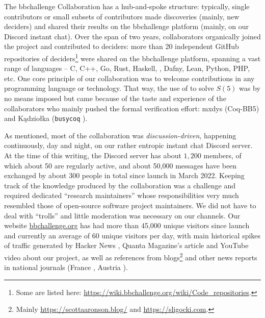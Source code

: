 \documentclass[a4paper,british]{article}
\theoremstyle{definition} %
\numberwithin{equation}{section}
\theoremstyle{definition} %
\newcommand{\CoqBB}{Coq-BB5\xspace}
\begin{document}
The bbchallenge Collaboration has a hub-and-spoke structure: typically, single contributors or small subsets of contributors made discoveries (mainly, new deciders) and shared their results on the bbchallenge platform (mainly, on our Discord instant chat). Over the span of two years, collaborators organically joined the project and contributed to deciders: more than 20 independent GitHub repositories of deciders\footnote{Some are listed here: \url{https://wiki.bbchallenge.org/wiki/Code_repositories}.} were shared on the bbchallenge platform, spanning a vast range of languages -- C, C++, Go, Rust, Haskell, \Coq, Dafny, Lean, Python, PHP, etc. One core principle of our collaboration was to welcome contributions in any programming language or technology. That way, the use of \Coq to solve $S(5)$ was by no means imposed but came because of the taste and experience of the collaborators who mainly pushed the formal verification effort: mxdys (\CoqBB) and Kądziołka (\texttt{busycoq} \cite{busycoq}).


As mentioned, most of the collaboration was \textit{discussion-driven}, happening continuously, day and night, on our rather entropic instant chat Discord server. At the time of this writing, the Discord server has about $1{,}200$ members, of which about 50 are regularly active, and about 50,000 messages have been exchanged by about 300 people in total since launch in March 2022. Keeping track of the knowledge produced by the collaboration was a challenge and required dedicated ``research maintainers'' whose responsibilities very much resembled those of open-source software project maintainers. We did not have to deal with ``trolls'' and little moderation was necessary on our channels. Our website \href{https://bbchallenge.or}{bbchallenge.org} has had more than 45,000 unique visitors since launch and currently an average of 60 unique visitors per day, with main historical spikes of traffic generated by Hacker News \cite{bmc7505_2023_busybeaver}, Quanta Magazine's article \cite{brubaker2024_bb5_quanta} and YouTube video \cite{quanta2025_busybeaver_video} about our project, as well as references from blogs\footnote{Mainly \url{https://scottaaronson.blog/} and \url{https://sligocki.com}.} and other news reports in national journals (France \cite{larousserie2024_castor}, Austria \cite{derstandard2025_fleissiger_biber}).
\end{document}
